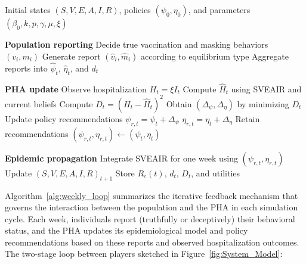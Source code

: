 \documentclass[sigconf,review]{acmart}
\begin{document}
\begin{algorithm}[tbp]
\small
\caption{Weekly Population–PHA Interaction Loop}
\label{alg:weekly_loop}
\begin{algorithmic}[1]
\Require Initial states $(S,V,E,A,I,R)$,
    policies $(\psi_0,\eta_0)$, and parameters
    $(\beta_0,k,p,\gamma,\mu,\xi)$

    \State \textbf{Population reporting}
        \State Decide true vaccination and masking
            behaviors $(v_i,m_i)$
        \State Generate report $(\hat v_i,\hat m_i)$
            according to equilibrium type
    \EndFor
    \State Aggregate reports into
        $\hat\psi_t$, $\hat\eta_t$, and $d_t$
    \Statex

    \State \textbf{PHA update}
    \State Observe hospitalization $H_t=\xi I_t$
    \State Compute $\hat H_t$ using SVEAIR
        and current beliefs
    \State Compute $D_t=(H_t-\hat H_t)^2$
        \State Obtain $(\Delta_\psi,\Delta_\eta)$
            by minimizing $D_t$
        \State Update policy recommendations
        \Statex \hspace{\algorithmicindent}
            $\psi_{r,t}=\psi_t+\Delta_\psi$
        \Statex \hspace{\algorithmicindent}
            $\eta_{r,t}=\eta_t+\Delta_\eta$
    \Else
        \State Retain recommendations
        \Statex \hspace{\algorithmicindent}
            $(\psi_{r,t},\eta_{r,t})
            \gets(\psi_t,\eta_t)$
    \EndIf
    \Statex

    \State \textbf{Epidemic propagation}
    \State Integrate SVEAIR for one week
        using $(\psi_{r,t},\eta_{r,t})$
    \State Update $(S,V,E,A,I,R)_{t+1}$
    \State Store $R_c(t)$, $d_t$, $D_t$,
        and utilities
\EndFor
\end{algorithmic}
\end{algorithm}

Algorithm~\ref{alg:weekly_loop} summarizes the iterative feedback mechanism that governs the interaction between the population and the PHA in each simulation cycle. Each week, individuals report (truthfully or deceptively) their behavioral status, and the PHA updates its epidemiological model and policy recommendations based on these reports and observed hospitalization outcomes. The two-stage loop between players sketched in Figure~\ref{fig:System_Model}:
\end{document}
